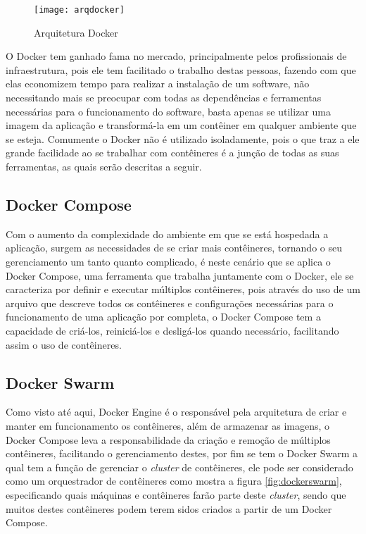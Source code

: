 \begin{figure}[!h]
\caption{\label{fig:arqdocker} Arquitetura Docker}
\begin{center}
\texttt{[image: arqdocker]}
\end{center}
\end{figure}

O Docker tem ganhado fama no mercado, principalmente pelos profissionais de infraestrutura, pois ele tem facilitado o trabalho destas pessoas, fazendo com que elas economizem tempo para realizar a instalação de um software, não necessitando mais se preocupar com todas as dependências e ferramentas necessárias para o funcionamento do software, basta apenas se utilizar uma imagem da aplicação e transformá-la em um contêiner em qualquer ambiente que se esteja. Comumente o Docker não é utilizado isoladamente, pois o que traz a ele grande facilidade ao se trabalhar com contêineres é a junção de todas as suas ferramentas, as quais serão descritas a seguir.~\cite{docker}

\subsection{Docker Compose}
Com o aumento da complexidade do ambiente em que se está hospedada a aplicação, surgem as necessidades de se criar mais contêineres, tornando o seu gerenciamento um tanto quanto complicado, é neste cenário que se aplica o Docker Compose, uma ferramenta que trabalha juntamente com o Docker, ele se caracteriza por definir e executar múltiplos contêineres, pois através do uso de um arquivo que descreve todos os contêineres e configurações necessárias para o funcionamento de uma aplicação por completa, o Docker Compose tem a capacidade de criá-los, reiniciá-los e desligá-los quando necessário, facilitando assim o uso de contêineres.~\cite{docker}

\subsection{Docker Swarm}
Como visto até aqui, Docker Engine é o responsável pela arquitetura de criar e manter em funcionamento os contêineres, além de armazenar as imagens, o Docker Compose leva a responsabilidade da criação e remoção de múltiplos contêineres, facilitando o gerenciamento destes, por fim se tem o Docker Swarm a qual tem a função de gerenciar o \textit{cluster} de contêineres, ele pode ser considerado como um orquestrador de contêineres como mostra a figura \ref{fig:dockerswarm}, especificando quais máquinas e contêineres farão parte deste \textit{cluster}, sendo que muitos destes contêineres podem terem sidos criados a partir de um Docker Compose.   

